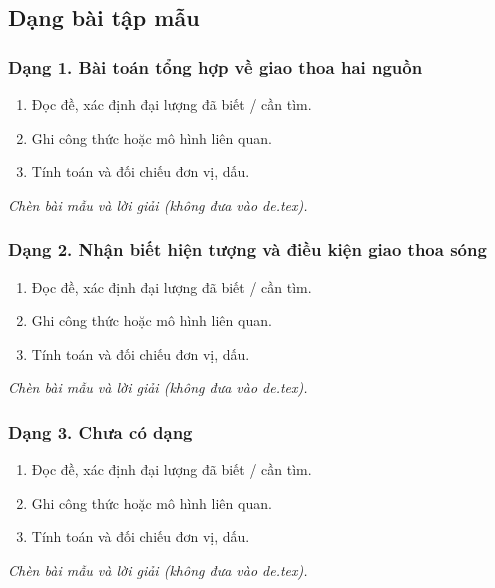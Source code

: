 

\subsection{Dạng bài tập mẫu}
\subsubsection{Dạng 1. Bài toán tổng hợp về giao thoa hai nguồn}
\begin{phuongphap}
\begin{enumerate}
\item Đọc đề, xác định đại lượng đã biết / cần tìm.
\item Ghi công thức hoặc mô hình liên quan.
\item Tính toán và đối chiếu đơn vị, dấu.
\end{enumerate}
\end{phuongphap}
\begin{vidumau}
\textit{Chèn bài mẫu và lời giải (không đưa vào de.tex).}
\end{vidumau}

\subsubsection{Dạng 2. Nhận biết hiện tượng và điều kiện giao thoa sóng}
\begin{phuongphap}
\begin{enumerate}
\item Đọc đề, xác định đại lượng đã biết / cần tìm.
\item Ghi công thức hoặc mô hình liên quan.
\item Tính toán và đối chiếu đơn vị, dấu.
\end{enumerate}
\end{phuongphap}
\begin{vidumau}
\textit{Chèn bài mẫu và lời giải (không đưa vào de.tex).}
\end{vidumau}

\subsubsection{Dạng 3. Chưa có dạng}
\begin{phuongphap}
\begin{enumerate}
\item Đọc đề, xác định đại lượng đã biết / cần tìm.
\item Ghi công thức hoặc mô hình liên quan.
\item Tính toán và đối chiếu đơn vị, dấu.
\end{enumerate}
\end{phuongphap}
\begin{vidumau}
\textit{Chèn bài mẫu và lời giải (không đưa vào de.tex).}
\end{vidumau}

